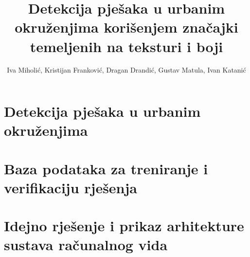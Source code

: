 \documentclass[seminar]{fer}
\title{Detekcija pješaka u urbanim okruženjima korišenjem značajki temeljenih na teksturi i boji}
\author{Iva Miholić, Kristijan Franković, Dragan Drandić, Gustav Matula, Ivan Katanić}
\begin{document}
\maketitle

\chapter{Detekcija pješaka u urbanim okruženjima}

\chapter{Baza podataka za treniranje i verifikaciju rješenja}

\chapter{Idejno rješenje i prikaz arhitekture sustava računalnog vida}
\end{document}
